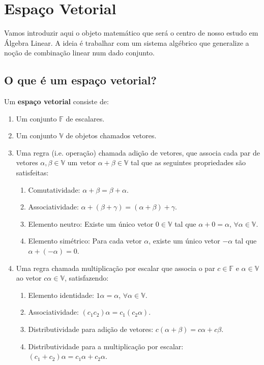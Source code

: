 \documentclass[12pt,a4paper]{article}
\begin{document}
\newpage
\section{Espaço Vetorial}

Vamos introduzir aqui o objeto matemático que será o centro de nosso estudo em Álgebra Linear. A ideia é trabalhar com um sistema algébrico que generalize a noção de combinação linear num dado conjunto.

\subsection{O que é um espaço vetorial?}

Um \textbf{espaço vetorial} consiste de:

\begin{enumerate}
\item Um conjunto $\mathbb{F}$ de escalares.
\item Um conjunto $\mathbb{V}$ de objetos chamados vetores.
\item Uma regra (i.e. operação) chamada adição de vetores, que associa cada par de vetores $\alpha , \beta \in \mathbb{V}$ um vetor $\alpha + \beta \in \mathbb{V}$ tal que as seguintes propriedades são satisfeitas:
\begin{enumerate}
\item Comutatividade: $\alpha + \beta = \beta + \alpha$.
\item Associatividade: $\alpha + ( \beta + \gamma ) = ( \alpha + \beta ) + \gamma$.
\item Elemento neutro: Existe um único vetor $0 \in \mathbb{V}$ tal que $\alpha + 0 = \alpha$, $\forall \alpha \in \mathbb{V}$.
\item Elemento simétrico: Para cada vetor $\alpha$, existe um único vetor $- \alpha$ tal que $\alpha + (- \alpha) = 0$.
\end{enumerate}
\item Uma regra chamada multiplicação por escalar que associa o par $c \in \mathbb{F}$ e $\alpha \in \mathbb{V}$ ao vetor $c \alpha \in \mathbb{V}$, satisfazendo:
\begin{enumerate}
\item Elemento identidade: $1 \alpha = \alpha$, $\forall \alpha \in \mathbb{V}$.
\item Associatividade: $(c_1 c_2) \alpha = c_1 (c_2 \alpha)$.
\item Distributividade para adição de vetores: $c(\alpha + \beta) = c \alpha + c \beta$.
\item Distributividade para a multiplicação por escalar: $(c_1 + c_2) \alpha = c_1 \alpha + c_2 \alpha$.
\end{enumerate}
\end{enumerate}
\end{document}
